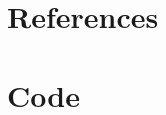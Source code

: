 \documentclass[pdftex,12pt,a4paper]{report}
\begin{document}
\deckblatt
\erklaerung



\tableofcontents








\appendix

\chapter{References}

\listoffigures

\begingroup
\let\clearpage\relax
\listoftables
\endgroup




\chapter{Code}
\end{document}
